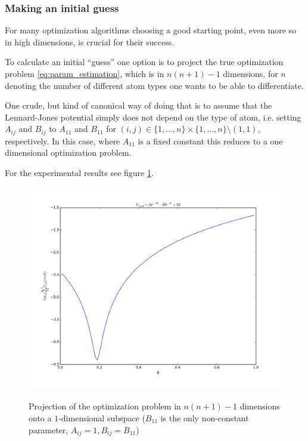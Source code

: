\documentclass[12pt]{article}
\theoremstyle{definition}\newtheorem*{definition}{Definition}
\theoremstyle{definition}\newtheorem*{remark}{Remark}
\begin{document}
\subsubsection{Making an initial guess}

For many optimization algorithms choosing a good starting point, even more so in high dimensions, is crucial for their success.

To calculate an initial ``guess'' one option is to project the true optimization problem \eqref{eq:param_estimation}, which is in $n(n+1)-1$ dimensions, for $n$ denoting the number of different atom types one wants to be able to differentiate.

One crude, but kind of canonical way of doing that is to assume that the Lennard-Jones potential simply does not depend on the type of atom, i.e. setting $A_{ij}$ and $B_{ij}$ to $A_{11}$ and $B_{11}$ for $(i,j)\in \{1,\dots,n\}\times\{1,\dots,n\}\setminus (1,1)$, respectively. In this case, where $A_{11}$ is a fixed constant this reduces to a one dimensional optimization problem.

For the experimental results see figure \ref{fig:param_estimation_projection}.

\begin{figure}
\caption{Projection of the optimization problem in $n(n+1)-1$ dimensions onto a $1$-dimensional subspace ($B_{11}$ is the only non-constant parameter, $A_{ij}=1, B_{ij}=B_{11}$)}
\includegraphics[width=1\linewidth]{sumoverU.png}
\label{fig:param_estimation_projection}
\end{figure}
\end{document}
